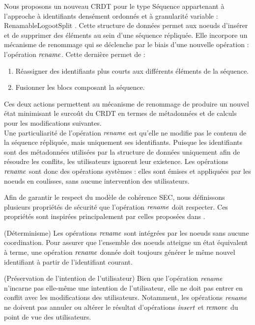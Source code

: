 Nous proposons un nouveau \ac{CRDT} pour le type Séquence appartenant à l'approche à identifiants densément ordonnés et à granularité variable : RenamableLogootSplit \cite{2020-rls-papoc-nicolas,2022-rls-tpds-nicolas}.
Cette structure de données permet aux noeuds d'insérer et de supprimer des éléments au sein d'une séquence répliquée.
Elle incorpore un mécanisme de renommage qui se déclenche par le biais d'une nouvelle opération : l'opération $\mathit{rename}$.
Cette dernière permet de :
\begin{enumerate}
  \item Réassigner des identifiants plus courts aux différents éléments de la séquence.
  \item Fusionner les blocs composant la séquence.
\end{enumerate}
Ces deux actions permettent au mécanisme de renommage de produire un nouvel état minimisant le surcoût du \ac{CRDT} en termes de métadonnées et de calculs pour les modifications suivantes.\\

Une particuliarité de l'opération $\mathit{rename}$ est qu'elle ne modifie pas le contenu de la séquence répliquée, mais uniquement ses identifiants.
Puisque les identifiants sont des métadonnées utilisées par la structure de données uniquement afin de résoudre les conflits, les utilisateurs ignorent leur existence.
Les opérations $\mathit{rename}$ sont donc des opérations systèmes : elles sont émises et appliquées par les noeuds en coulisses, sans aucune intervention des utilisateurs.

Afin de garantir le respect du modèle de cohérence \ac{SEC}, nous définissons plusieurs propriétés de sécurité que l'opération $\mathit{rename}$ doit respecter.
Ces propriétés sont inspirées principalement par celles proposées dans \cite{zawirski:hal-01248197}.

\begin{property}(Déterminisme)
  Les opérations $\mathit{rename}$ sont intégrées par les noeuds sans aucune coordination.
  Pour assurer que l'ensemble des noeuds atteigne un état équivalent à terme, une opération $\mathit{rename}$ donnée doit toujours générer le même nouvel identifiant à partir de l'identifiant courant.
\end{property}

\begin{property}(Préservation de l'intention de l'utilisateur)
  \label{prop:rename-op-intention-preservation}
  Bien que l'opération $\mathit{rename}$ n'incarne pas elle-même une intention de l'utilisateur, elle ne doit pas entrer en conflit avec les modifications des utilisateurs.
  Notamment, les opérations $\mathit{rename}$ ne doivent pas annuler ou altérer le résultat d'opérations $\mathit{insert}$ et $\mathit{remove}$ du point de vue des utilisateurs.
\end{property}

